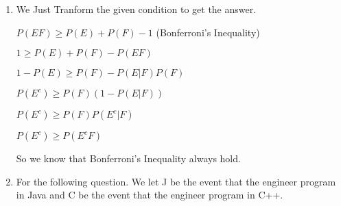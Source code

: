 \documentclass{article}
\begin{document}
\thispagestyle{fancy} %

\begin{enumerate}


	\item 

		
		 We Just Tranform the given condition to get the answer.
		
		$P(EF) \geq P(E) + P(F)-1$  (Bonferroni’s Inequality)
		
		$1 \geq P(E) + P(F)-P(EF)$
		
		$1-P(E)\geq P(F)-P(E|F)P(F)$
		
		$P(E^c)\geq P(F)(1-P(E|F))$
		
		$P(E^c)\geq P(F)P(E^c|F)$
		
		$P(E^c)\geq P(E^cF)$
		
		So we know that Bonferroni’s Inequality always hold.
	\item For the following question. We let J be the event that the engineer program in Java and C be the event that the engineer program in C++.
	

\end{enumerate}
\end{document}
